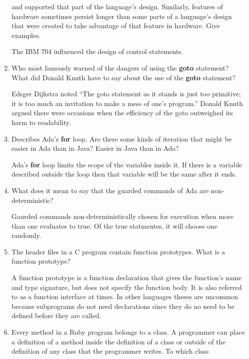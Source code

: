 \begin{enumerate}
and supported that part of the language's design.
Similarly, features of hardware sometimes persist longer
than some parts of a language's design that were created
to take advantage of that feature in hardware.
Give examples.
\begin{answer}
The IBM 704 influenced the design of control statements.
\end{answer}
\item Who most famously warned of the dangers of using the
\textbf{goto} statement? What did Donald Knuth have to
say about the use of the \textbf{goto} statement?
\begin{answer}
Edsger Dijkstra noted “The goto statement as it stands is just too primitive; it is too much an invitation to make a mess of one’s program.” Donald Knuth argued there were occasions when the efficiency of the goto outweighed its harm to readability.
\end{answer}
\item Describes Ada's \textbf{for} loop. Are there some
kinds of iteration that might be easier in Ada than
in Java? Easier in Java than in Ada?
\begin{answer}
Ada's \textbf{for} loop limits the scope of the variables inside it. If there is a variable described outside the loop then that variable will be the same after it ends.
\end{answer}
\item What does it mean to say that the guarded commands
of Ada are non-deterministic?
\begin{answer}
Gaurded commands non-deterministically chosen for execution when more than one evaluates to true. Of the true statmentes, it will choose one randomly.
\end{answer}
\item The header files in a C program contain function
prototypes. What is a function prototype?
\begin{answer}
A function prototype is a function declaration that gives the function's name and type signature, but does not specify the function body. It is also referred to as a function interface at times. In other languages theses are uncommon because subprograms do not need declarations since they do no need to be defined before they are called.
\end{answer}
\item Every method in a Ruby program belongs to a class.
A programmer can place a definition of a method inside
the definition of a class or outside of the definition
of any class that the programmer writes. To which class

\end{enumerate}
